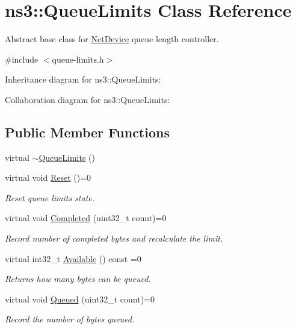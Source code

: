 \hypertarget{classns3_1_1QueueLimits}{}\section{ns3\+:\+:Queue\+Limits Class Reference}
\label{classns3_1_1QueueLimits}


Abstract base class for \hyperlink{classns3_1_1NetDevice}{Net\+Device} queue length controller.  




{\ttfamily \#include $<$queue-\/limits.\+h$>$}



Inheritance diagram for ns3\+:\+:Queue\+Limits\+:


Collaboration diagram for ns3\+:\+:Queue\+Limits\+:
\subsection*{Public Member Functions}
\begin{DoxyCompactItemize}
\item 
virtual \hyperlink{classns3_1_1QueueLimits_a41a2ad95fc7cf8b0ce4c18a9087fcbc7}{$\sim$\+Queue\+Limits} ()
\item 
virtual void \hyperlink{classns3_1_1QueueLimits_a646f81a6ce23d7e005d7ca7e4f98bab9}{Reset} ()=0
\begin{DoxyCompactList}\small\item\em Reset queue limits state. \end{DoxyCompactList}\item 
virtual void \hyperlink{classns3_1_1QueueLimits_adac8dd4e161b7b9e49f369852e90d0c0}{Completed} (uint32\+\_\+t count)=0
\begin{DoxyCompactList}\small\item\em Record number of completed bytes and recalculate the limit. \end{DoxyCompactList}\item 
virtual int32\+\_\+t \hyperlink{classns3_1_1QueueLimits_add8726121604ba48146ff3f62a8051c6}{Available} () const =0
\begin{DoxyCompactList}\small\item\em Returns how many bytes can be queued. \end{DoxyCompactList}\item 
virtual void \hyperlink{classns3_1_1QueueLimits_a79591fdecc7ec76388b9b85d060faef9}{Queued} (uint32\+\_\+t count)=0
\begin{DoxyCompactList}\small\item\em Record the number of bytes queued. \end{DoxyCompactList}\end{DoxyCompactItemize}

